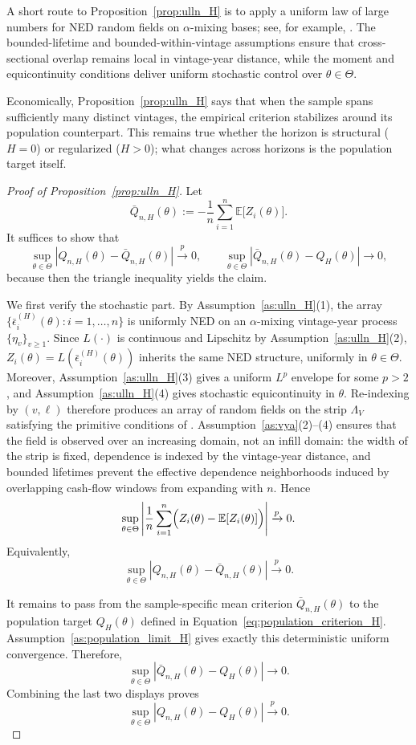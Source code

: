A short route to Proposition~\ref{prop:ulln_H} is to apply a uniform law of large numbers for NED random fields on \(\alpha\)-mixing bases; see, for example, \citet[Theorem~6]{JP09}. The bounded-lifetime and bounded-within-vintage assumptions ensure that cross-sectional overlap remains local in vintage-year distance, while the moment and equicontinuity conditions deliver uniform stochastic control over \(\theta \in \Theta\).

Economically, Proposition~\ref{prop:ulln_H} says that when the sample spans sufficiently many distinct vintages, the empirical criterion stabilizes around its population counterpart. This remains true whether the horizon is structural (\(H=0\)) or regularized (\(H>0\)); what changes across horizons is the population target itself.

\begin{proof}[Proof of Proposition~\ref{prop:ulln_H}]
	Let
	\[
	\bar Q_{n,H}(\theta)
	:=
	-
	\frac{1}{n}
	\sum_{i=1}^n \mathbb E\bigl[Z_i(\theta)\bigr].
	\]
	It suffices to show that
	\[
	\sup_{\theta\in\Theta}
	\left|
	Q_{n,H}(\theta)-\bar Q_{n,H}(\theta)
	\right|
	\xrightarrow{p}0,
	\qquad
	\sup_{\theta\in\Theta}
	\left|
	\bar Q_{n,H}(\theta)-Q_H(\theta)
	\right|
	\to 0,
	\]
	because then the triangle inequality yields the claim.
	
	We first verify the stochastic part. By Assumption~\ref{as:ulln_H}(1), the array
	$\{\bar\epsilon_i^{(H)}(\theta): i=1,\dots,n\}$ is uniformly NED on an
	$\alpha$-mixing vintage-year process $\{\eta_v\}_{v\ge 1}$.
	Since $L(\cdot)$ is continuous and Lipschitz by Assumption~\ref{as:ulln_H}(2),
	$Z_i(\theta)=L(\bar\epsilon_i^{(H)}(\theta))$ inherits the same NED structure,
	uniformly in $\theta \in \Theta$.
	Moreover, Assumption~\ref{as:ulln_H}(3) gives a uniform $L^p$ envelope for some $p>2$,
	and Assumption~\ref{as:ulln_H}(4) gives stochastic equicontinuity in $\theta$.
	Re-indexing by $(v,\ell)$ therefore produces an array of random fields on the strip
	$\Lambda_V$ satisfying the primitive conditions of
	\citet[Theorem~6]{JP09}.
	Assumption~\ref{as:vya}(2)--(4) ensures that the field is observed over an increasing domain,
	not an infill domain: the width of the strip is fixed, dependence is indexed by the vintage-year distance,
	and bounded lifetimes prevent the effective dependence neighborhoods induced by overlapping cash-flow windows from expanding with $n$.
	Hence
	\[
	\sup_{\theta\in\Theta}
	\left|
	\frac{1}{n}
	\sum_{i=1}^n
	\Bigl(Z_i(\theta)-\mathbb E[Z_i(\theta)]\Bigr)
	\right|
	\xrightarrow{p}0.
	\]
	Equivalently,
	\[
	\sup_{\theta\in\Theta}
	\left|
	Q_{n,H}(\theta)-\bar Q_{n,H}(\theta)
	\right|
	\xrightarrow{p}0.
	\]
	
	It remains to pass from the sample-specific mean criterion $\bar Q_{n,H}(\theta)$ to the population target $Q_H(\theta)$ defined in Equation~\eqref{eq:population_criterion_H}.
	Assumption~\ref{as:population_limit_H} gives exactly this deterministic uniform convergence. Therefore,
	\[
	\sup_{\theta\in\Theta}
	\left|
	\bar Q_{n,H}(\theta)-Q_H(\theta)
	\right|
	\to 0.
	\]
	Combining the last two displays proves
	\[
	\sup_{\theta\in\Theta}
	\left|
	Q_{n,H}(\theta)-Q_H(\theta)
	\right|
	\xrightarrow{p}0.
	\]
\end{proof}

